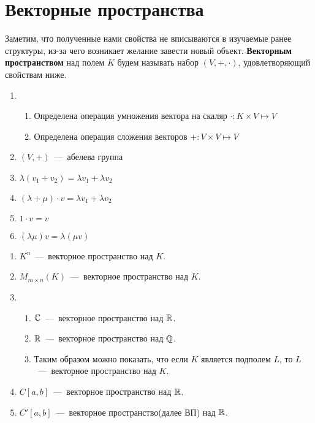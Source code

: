 \section{Векторные пространства}
Заметим, что полученные нами свойства не вписываются в изучаемые ранее структуры, из-за чего возникает желание завести новый объект. 
 \textbf{Векторным пространством} над полем $K$ будем называть набор $(V, +, \cdot)$, удовлетворяющий свойствам ниже.
\begin{properties}\leavevmode
    \begin{enumerate}
        \item 
            \begin{enumerate}
                \item Определена операция умножения вектора на скаляр $\cdot: K \times V \mapsto V$
                \item Определена операция сложения векторов $+: V \times V \mapsto V$
            \end{enumerate}
        \item $(V,+)$~---~абелева группа
        \item $\lambda(v_1 + v_2) = \lambda v_1 + \lambda v_2$
        \item $(\lambda + \mu)\cdot v = \lambda v_1 + \lambda v_2$
        \item $1\cdot v = v$
        \item $(\lambda\mu)v = \lambda(\mu v)$
    \end{enumerate}
\end{properties}
\begin{examples}\leavevmode
    \begin{enumerate}
        \item $K^n$~---~векторное пространство над $K$.
        \item $M_{m\times n}(K)$~---~векторное пространство над $K$.
        \item
            \begin{enumerate}
                \item $\mathbb{C}$~---~векторное пространство над $\mathbb{R}$.
                \item $\mathbb{R}$~---~векторное пространство над $\mathbb{Q}$.
                \item Таким образом можно показать, что если $K$ является подполем $L$, то $L$~---~векторное пространство над $K$.
            \end{enumerate}
        \item $C[a,b]$~---~векторное пространство над $\mathbb{R}$.
        \item $C'[a,b]$~---~векторное пространство(далее ВП) над $\mathbb{R}$.
    \end{enumerate}
\end{examples}
